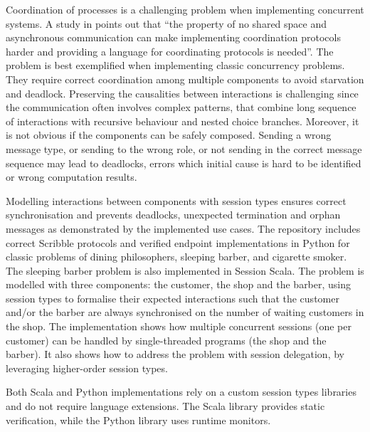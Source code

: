 
Coordination of processes is a challenging problem
when implementing concurrent systems.
A study in \cite{ActorCoordinationStudy} points out that
``the property of no shared space and asynchronous communication
can make implementing coordination protocols harder and
providing a language for coordinating protocols is needed''.
The problem is best exemplified when implementing
classic concurrency problems. They require correct coordination
among multiple components to avoid starvation and deadlock.
Preserving the causalities between interactions is
challenging since the communication often involves complex patterns,
that combine long sequence of interactions with recursive behaviour
and nested choice branches. Moreover, it is not obvious if the components can be safely composed.
Sending a wrong message type, or sending to the wrong role,
or not sending in the correct message sequence may lead to deadlocks,
errors which initial cause is hard to be identified or wrong computation results.


Modelling interactions between components with session types ensures
correct synchronisation and prevents deadlocks,
unexpected termination and orphan messages as demonstrated by the implemented use cases. The repository includes correct Scribble protocols and verified endpoint implementations in Python for classic problems of dining philosophers, sleeping barber, and
cigarette smoker. The sleeping barber problem is also implemented in Session Scala. The problem is modelled with three components: the customer, the shop and the barber, using session types to formalise their expected interactions such that the customer and/or the barber are always synchronised on the number of waiting customers in the shop. The implementation shows how multiple concurrent sessions (one per customer) can be handled by single-threaded programs (the shop and the barber). It also shows how to address the problem with session delegation, by leveraging higher-order session types. 

Both Scala and Python implementations rely on a custom session types libraries and do not require language extensions. The Scala library provides static verification, while the Python library uses runtime monitors.  

